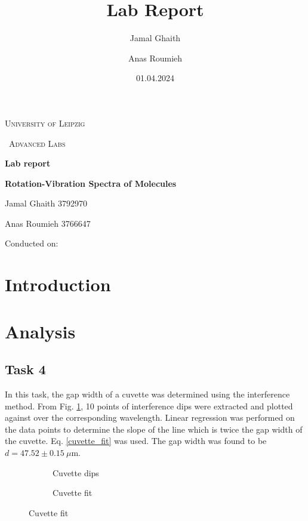 \documentclass{article}
\title{Lab Report}
\author{Jamal Ghaith}
\author{Anas Roumieh}
\date{01.04.2024}
\begin{document}
\begin{titlepage}
	\centering
	{\scshape\LARGE University of Leipzig \par}
	\vspace{1cm}
	{\scshape\ Advanced Labs\par}
	\vspace{1.5cm}
	{\huge\bfseries Lab report\par}
	\vspace{2cm}
	{\huge\bfseries Rotation-Vibration Spectra of Molecules\par}
	\vspace{2cm}
	{\Large Jamal Ghaith 3792970\par}
    {\Large Anas Roumieh 3766647\par}
	\vfill

    {\Large Conducted on: \par}
	\vfill
\end{titlepage}


\tableofcontents
{}
\pagebreak{}

\section{Introduction}

\pagebreak{}

\section{Analysis}

\subsection{Task 4}

In this task, the gap width of a cuvette was determined using the interference method. From Fig. \ref{fig:Cuvette dips}, 10 points of interference dips were extracted and plotted against over the corresponding wavelength. Linear regression was performed on the data points to determine the slope of the line which is twice the gap width of the cuvette. Eq. \ref{cuvette_fit} was used. The gap width was found to be $d = 47.52 \pm 0.15 \ \mu$m.


\begin{figure}[h!]
	\centering
	\begin{subfigure}{0.45\textwidth}
		\centering
		\scalebox{0.50}{}
		\caption{Cuvette dips}
		\label{fig:Cuvette dips}
	\end{subfigure}
	\hspace{0.5cm}
	\begin{subfigure}{0.45\textwidth}
		\centering
		\scalebox{0.50}{}
		\caption{Cuvette fit}
		\label{fig:Cuvette_fit}
	\end{subfigure}
\end{figure}
\end{document}
